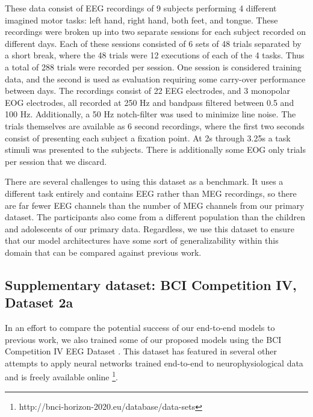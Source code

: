 \documentclass[fleqn,10pt]{wlscirep}
\begin{document}
These data consist of EEG recordings of 9 subjects performing 4 different imagined motor tasks: left hand, right hand, both feet, and tongue. These recordings were broken up into two separate sessions for each subject recorded on different days. Each of these sessions consisted of 6 sets of 48 trials separated by a short break, where the 48 trials were 12 executions of each of the 4 tasks. Thus a total of 288 trials were recorded per session. One session is considered training data, and the second is used as evaluation requiring some carry-over performance between days. The recordings consist of 22 EEG electrodes, and 3 monopolar EOG electrodes, all recorded at 250 Hz and bandpass filtered between 0.5 and 100 Hz. Additionally, a 50 Hz notch-filter was used to minimize line noise. The trials themselves are available as 6 second recordings, where the first two seconds consist of presenting each subject a fixation point. At 2s through 3.25s a task stimuli was presented to the subjects. There is additionally some EOG only trials per session that we discard. 

There are several challenges to using this dataset as a benchmark. It uses a different task entirely and contains EEG rather than MEG recordings, so there are far fewer EEG channels than the number of MEG channels from our primary dataset. The participants also come from a different population than the children and adolescents of our primary data. Regardless, we use this dataset to ensure that our model architectures have some sort of generalizability within this domain that can be compared against previous work. 

\subsection*{Supplementary dataset: BCI Competition IV, Dataset 2a}

In an effort to compare the potential success of our end-to-end models to previous work, we also trained some of our proposed models using the BCI Competition IV EEG Dataset \cite{Tangermann2012}. This dataset has featured in several other attempts to apply neural networks trained end-to-end to neurophysiological data \cite{Schirrmeister2017,Tabar2017,Lawhern2017,Sun} and is freely available online \footnote{http://bnci-horizon-2020.eu/database/data-sets}.
\end{document}
